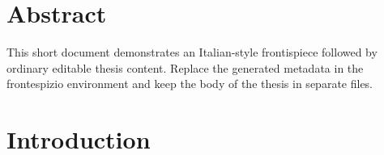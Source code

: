 \documentclass[a4paper,12pt]{article}
\begin{document}
\begin{frontespizio}
\end{frontespizio}

\section*{Abstract}
This short document demonstrates an Italian-style frontispiece followed by
ordinary editable thesis content. Replace the generated metadata in the
frontespizio environment and keep the body of the thesis in separate files.

\section{Introduction}
\lipsum[1]
\end{document}
